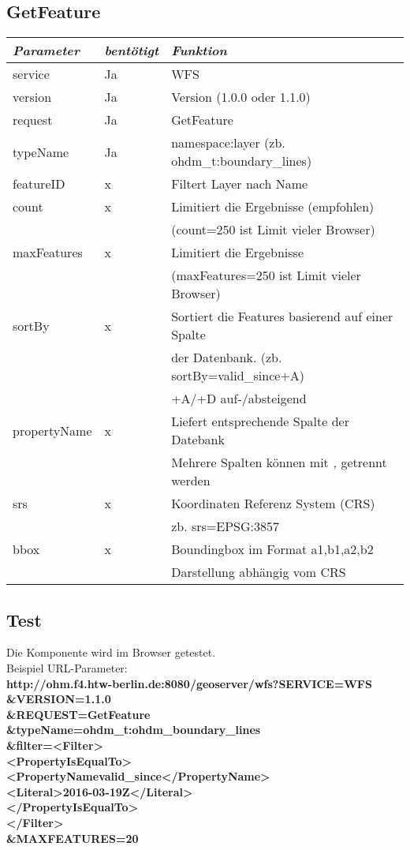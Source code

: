 \documentclass[12pt]{article}
\begin{document}
\subsection{GetFeature}
\begin{tabular}{lll}
\emph{Parameter} & \emph{bentötigt} & \emph{Funktion} \\
\hline
service	& Ja & 	 WFS\\
\hline
version	& Ja &	 Version (1.0.0 oder 1.1.0)\\
\hline
request	& Ja &	GetFeature\\
\hline
typeName	& Ja &	namespace:layer (zb. ohdm\_t:boundary\_lines)\\
\hline
featureID & x & Filtert Layer nach Name\\
\hline
count & x & Limitiert die Ergebnisse (empfohlen)\\&& (count=250 ist Limit vieler Browser)\\
\hline
maxFeatures & x & Limitiert die Ergebnisse \\&&(maxFeatures=250 ist Limit vieler Browser)\\
\hline
sortBy & x & Sortiert die Features basierend auf einer Spalte \\&&der Datenbank. (zb. sortBy=valid\_since+A)\\&& +A/+D auf-/absteigend\\
\hline
propertyName & x & Liefert entsprechende Spalte der Datebank\\&&Mehrere Spalten können mit \emph{,} getrennt werden\\
\hline
srs & x & Koordinaten Referenz System (CRS)\\&& zb. srs=EPSG:3857\\
\hline
bbox & x& Boundingbox im Format a1,b1,a2,b2\\&& Darstellung abhängig vom CRS\\
\end{tabular}
\subsection{Test}
Die Komponente wird im Browser getestet.\\
Beispiel URL-Parameter:\\
\textbf{http://ohm.f4.htw-berlin.de:8080/geoserver/wfs?SERVICE=WFS\\
\&VERSION=1.1.0\\
\&REQUEST=GetFeature\\
\&typeName=ohdm\_t:ohdm\_boundary\_lines\\
\&filter=\textless Filter\textgreater \\
 \textless PropertyIsEqualTo\textgreater \\
\textless PropertyNamevalid\_since\textless /PropertyName\textgreater\\
\textless Literal\textgreater 2016-03-19Z\textless /Literal\textgreater \\
\textless /PropertyIsEqualTo\textgreater \\
\textless /Filter\textgreater\\
\&MAXFEATURES=20\\}\\
\end{document}
